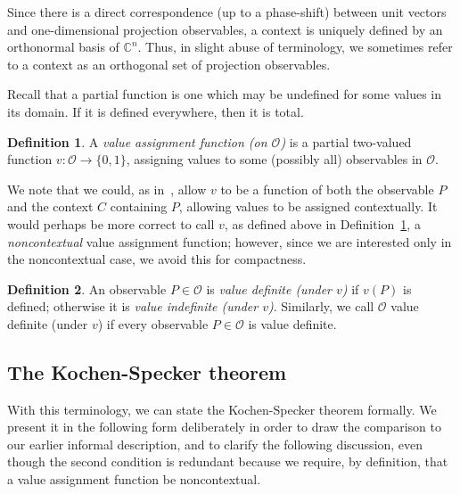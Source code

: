 \documentclass[%
 superscriptaddress,
 preprint,
 showpacs,
 showkeys,
 nofootinbib,
  amsmath,amssymb,
  aps,
  longbibliography,
  floatfix,
 ]{revtex4-1}
\theoremstyle{definition}
\newtheorem{definition}{Definition}
\newcommand{\C}{\mathbb{C}}
\begin{document}
Since there is a direct correspondence {\color{blue}(up to a phase-shift)} between unit vectors and {\color{blue}one-dimensional} projection observables, a context is uniquely defined by an orthonormal basis of $\C^n$.
Thus, in slight abuse of terminology, we sometimes refer to a context as an orthogonal set of projection observables.

Recall that a partial function is one which may be undefined for some values in its domain.
If it is defined everywhere, then it is total.
\begin{definition}\label{def:v}
	A \emph{value assignment function (on $\mathcal{O}$)} is a partial two-valued function $v: \mathcal{O} \to \{0,1\}$, assigning values to some (possibly all) observables in $\mathcal{O}$.
\end{definition}
We note that we could, as in~\cite{Abbott:2012fk}, allow $v$ to be a function of both the observable $P$ and the context $C$ containing $P$, allowing values to be assigned contextually.
It would perhaps be more correct to call $v$, as defined above in Definition~\ref{def:v}, a \emph{noncontextual} value assignment function; however, since we are interested only in the noncontextual case, we avoid this for compactness.

\begin{definition}
	An observable $P\in\mathcal{O}$ is \emph{value definite (under $v$)} if $v(P)$ is defined; otherwise it is \emph{value indefinite (under $v$)}.
	Similarly, we call $\mathcal{O}$ value definite (under $v$) if every observable $P\in\mathcal{O}$ is value definite.
\end{definition}


\subsection{The Kochen-Specker theorem}

With this terminology, we can state the Kochen-Specker theorem formally.
We present it in the following form deliberately in order to draw the comparison to our earlier informal description, and to clarify the following discussion, even though the second condition is redundant because we require, by definition, that a value assignment function be noncontextual.
\end{document}
